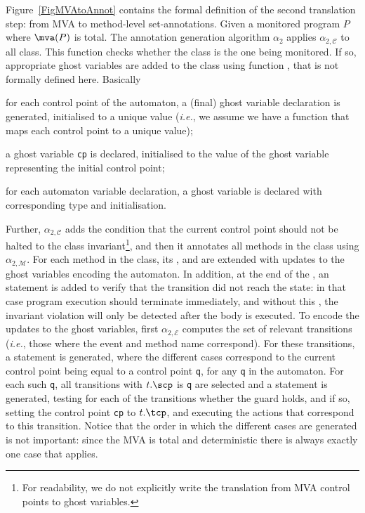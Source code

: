 Figure~\ref{FigMVAtoAnnot} contains the formal definition of the
second translation step: from MVA to method-level
set-annotations. Given a monitored program \(P\) where \(\mva(P)\) is
total. The annotation generation algorithm \(\alpha_2\) applies
\(\alpha_{2, \mathcal{C}}\) to all
class. This function checks whether the class is the one being
monitored. If so, appropriate ghost variables are added to the class
using function \newgvs, that is not formally defined here. Basically 
\begin{inparaenum}
\item for each control point of the automaton, a (final) ghost
variable declaration is generated, initialised to a unique value
(\emph{i.e.}, we assume we have a function \unique that maps each
control point to a unique value);
\item a ghost variable \texttt{cp} is declared, initialised to the
value of the ghost variable representing the initial control point;
\item for each automaton variable declaration, a ghost variable is
declared with corresponding type and initialisation.
\end{inparaenum}
Further, \(\alpha_{2, \mathcal{C}}\) adds the condition that the
current control point should not be halted to the class
invariant\footnote{For readability, we do not explicitly write the
translation from MVA control points to ghost variables.}, and then it
annotates all methods in the class using \(\alpha_{2,
\mathcal{M}}\). For each method in the class, its \preset, \postset
and \excset are extended with updates to the ghost variables encoding
the automaton. In addition, at the end of the \preset, an \Assert
statement is added to verify that the transition did not reach the
\halted state: in that case program execution should terminate
immediately, and without this \Assert, the invariant violation will
only be detected after the body is executed. To encode the updates to
the ghost variables, first \(\alpha_{2, \mathcal{E}}\) computes the
set of relevant transitions (\emph{i.e.}, those where the event and
method name correspond). For these transitions, a \CaseJML
statement is generated, where the different cases correspond to the current
control point being equal to a control point \texttt{q}, for any
\texttt{q} in the automaton. For each such \texttt{q}, all transitions
with \(t.\scp\) is \texttt{q} are selected and a \CaseJML
statement is generated, testing for each of the transitions whether
the guard holds, and if so, setting the control point \texttt{cp} to
\(t.\tcp\), and executing the actions that correspond to this
transition. 
Notice that the order in which the different cases are generated is
not important: since the MVA is total and deterministic there is
always exactly one case that applies.




